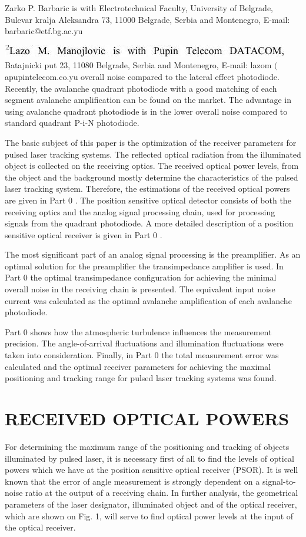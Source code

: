 \documentclass[10pt]{article}
\begin{document}
Zarko P. Barbaric is with Electrotechnical Faculty, University of Belgrade, Bulevar kralja Aleksandra 73, 11000 Belgrade, Serbia and Montenegro, E-mail: barbaric@etf.bg.ac.yu

\includegraphics[max width=\textwidth]{d2750892714501b765cfde22b041f38a-01} Batajnicki put 23, 11080 Belgrade, Serbia and Montenegro, E-mail: lazom \((\) apupintelecom.co.yu overall noise compared to the lateral effect photodiode. Recently, the avalanche quadrant photodiode with a good matching of each segment avalanche amplification can be found on the market. The advantage in using avalanche quadrant photodiode is in the lower overall noise compared to standard quadrant P-i-N photodiode.

The basic subject of this paper is the optimization of the receiver parameters for pulsed laser tracking systems. The reflected optical radiation from the illuminated object is collected on the receiving optics. The received optical power levels, from the object and the background mostly determine the characteristics of the pulsed laser tracking system. Therefore, the estimations of the received optical powers are given in Part 0 . The position sensitive optical detector consists of both the receiving optics and the analog signal processing chain, used for processing signals from the quadrant photodiode. A more detailed description of a position sensitive optical receiver is given in Part 0 .

The most significant part of an analog signal processing is the preamplifier. As an optimal solution for the preamplifier the transimpedance amplifier is used. In Part 0 the optimal transimpedance configuration for achieving the minimal overall noise in the receiving chain is presented. The equivalent input noise current was calculated as the optimal avalanche amplification of each avalanche photodiode.

Part 0 shows how the atmospheric turbulence influences the measurement precision. The angle-of-arrival fluctuations and illumination fluctuations were taken into consideration. Finally, in Part 0 the total measurement error was calculated and the optimal receiver parameters for achieving the maximal positioning and tracking range for pulsed laser tracking systems was found.

\section{RECEIVED OPTICAL POWERS}
For determining the maximum range of the positioning and tracking of objects illuminated by pulsed laser, it is necessary first of all to find the levels of optical powers which we have at the position sensitive optical receiver (PSOR). It is well known that the error of angle measurement is strongly dependent on a signal-to-noise ratio at the output of a receiving chain. In further analysis, the geometrical parameters of the laser designator, illuminated object and of the optical receiver, which are shown on Fig. 1, will serve to find optical power levels at the input of the optical receiver.
\end{document}
